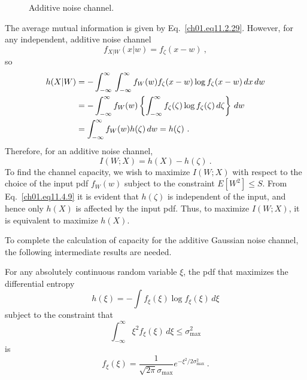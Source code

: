\begin{figure}[hbt] %
\figboxes
\caption{Additive noise channel.
\label{ch01.fig11.4.2} }
\end{figure}

The average mutual information is given by Eq.~\eqref{ch01.eq11.2.29}.
However, for any independent, additive noise channel
\begin{equation}
 f_{X|W} (x|w) = f_{\zeta} (x - w)~,
\label{ch01.eq11.4.7}
\end{equation}
so
\begin{align}
 h (X|W) & = - \int^\infty_{-\infty} \, \int^\infty_{-\infty}
 f_W (w) f_{\zeta} (x - w) \log f_{\zeta} (x - w) \, dx \,dw
 \notag\\
 & = - \int^\infty_{-\infty}
 f_W (w)  \left\{
 \int^\infty_{-\infty} f_{\zeta} (\zeta) \log f_{\zeta} (\zeta)
 \, d \zeta \right\} \,dw
 \notag\\
 & = \int^\infty_{-\infty} f_W (w) h (\zeta)\, dw = h (\zeta) ~.
\label{ch01.eq11.4.8}
\end{align}
Therefore, for an additive noise channel,
\begin{equation}
  I(W;X) = h(X) - h(\zeta)~.
\label{ch01.eq11.4.9}
\end{equation}
To find the channel capacity, we wish to maximize $I(W;X)$ with respect to the
choice of the input pdf $f_W (w)$ subject to the constraint $E[W^2] \leq S$.
From  Eq.~\eqref{ch01.eq11.4.9} it is evident that $h(\zeta)$ is independent
of the input, and hence only $h(X)$
is affected by the input pdf. Thus, to maximize $I(W;X)$, it is equivalent to
maximize $h(X)$.

To complete the calculation of capacity for the additive Gaussian noise
channel, the following intermediate results are needed.

\begin{theorem}
\label{ch01.th11.4.2}
For any absolutely
continuous random variable $\xi$, the pdf that maximizes the
differential entropy
\begin{equation}
 h(\xi) = - \int f_\xi (\xi) \log f_\xi(\xi) \, d\xi
\label{ch01.eq11.4.10}
\end{equation}
subject to the constraint that
\begin{equation}
  \int^\infty_{-\infty} \xi^2 f_\xi (\xi) \, d\xi \leq \sigma^2_{\max}
\label{ch01.eq11.4.11}
\end{equation}
is
\begin{equation}
  f_\xi (\xi) = \frac{1} { \sqrt{2\pi} \sigma_{\max} }
  e^{-\xi^2/2\sigma^2_{\max}}~.
\label{ch01.eq11.4.12}
\end{equation}
\end{theorem}

